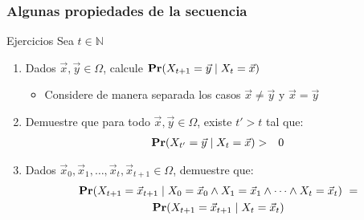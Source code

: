\begin{frame}
\frametitle{Algunas propiedades de la secuencia}

{\small

\begin{exampleblock}{Ejercicios}
Sea $t \in \mathbb{N}$
\begin{enumerate}
\item Dados $\vec x, \vec y \in \Omega$, calcule ${\rm {\bf Pr}}(X_{t+1} = \vec y \mid X_t = \vec x)$
\begin{itemize}
\item Considere de manera separada los casos $\vec x \neq \vec y$ y $\vec x = \vec y$
\end{itemize}


\item Demuestre que para todo $\vec x, \vec y \in \Omega$, existe $t' > t$ tal que:
\begin{eqnarray*}
{\rm {\bf Pr}}(X_{t'} = \vec y \mid X_t = \vec x) & > & 0
\end{eqnarray*}


\item Dados $\vec x_0, \vec x_1, \ldots, \vec x_t, \vec x_{t+1} \in \Omega$, demuestre que:
\begin{multline*}
{\rm {\bf Pr}}(X_{t+1} = \vec x_{t+1} \mid X_0 = \vec x_0 \wedge X_1 = \vec x_1 \wedge \cdots \wedge X_t = \vec x_t) \ = \\ 
{\rm {\bf Pr}}(X_{t+1} = \vec x_{t+1}  \mid X_t = \vec x_t)
\end{multline*}

\end{enumerate}
\end{exampleblock}

}

\end{frame}

